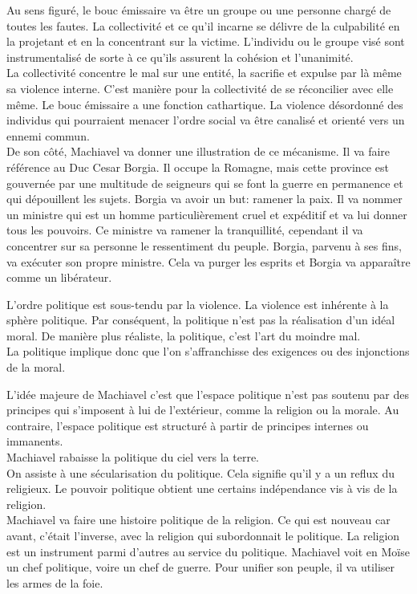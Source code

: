 \documentclass[10pt, a4paper, openany]{book}
\begin{document}
Au sens figuré, le bouc émissaire va être un groupe ou une personne chargé de toutes les fautes. La collectivité et ce qu'il incarne se délivre de la culpabilité en la projetant et en la concentrant sur la victime. L'individu ou le groupe visé sont instrumentalisé de sorte à ce qu'ils assurent la cohésion et l'unanimité. \\
La collectivité concentre le mal sur une entité, la sacrifie et expulse par là même sa violence interne. C'est manière pour la collectivité de se réconcilier avec elle même. Le bouc émissaire a une fonction cathartique. La violence désordonné des individus qui pourraient menacer l'ordre social va être canalisé et orienté vers un ennemi commun. \\
De son côté, Machiavel va donner une illustration de ce mécanisme. Il va faire référence au Duc Cesar Borgia. Il occupe la Romagne, mais cette province est gouvernée par une multitude de seigneurs qui se font la guerre en permanence et qui dépouillent les sujets. Borgia va avoir un but: ramener la paix. Il va nommer un ministre qui est un homme particulièrement cruel et expéditif et va lui donner tous les pouvoirs. Ce ministre va ramener la tranquillité, cependant il va concentrer sur sa personne le ressentiment du peuple. Borgia, parvenu à ses fins, va exécuter son propre ministre. Cela va purger les esprits et Borgia va apparaître comme un libérateur.


L'ordre politique est sous-tendu par la violence. La violence est inhérente à la sphère politique. Par conséquent, la politique n'est pas la réalisation d'un idéal moral. De manière plus réaliste, la politique, c'est l'art du moindre mal. \\
La politique implique donc que l'on s'affranchisse des exigences ou des injonctions de la moral. 


L'idée majeure de Machiavel c'est que l'espace politique n'est pas soutenu par des principes qui s'imposent à lui de l'extérieur, comme la religion ou la morale. Au contraire, l'espace politique est structuré à partir de principes internes ou immanents. \\
Machiavel rabaisse la politique du ciel vers la terre. \\
On assiste à une sécularisation du politique. Cela signifie qu'il y a un reflux du religieux. Le pouvoir politique obtient une certains indépendance vis à vis de la religion. \\
Machiavel va faire une histoire politique de la religion. Ce qui est nouveau car avant, c'était l'inverse, avec la religion qui subordonnait le politique. La religion est un instrument parmi d'autres au service du politique. Machiavel voit en Moïse un chef politique, voire un chef de guerre. Pour unifier son peuple, il va utiliser les armes de la foie. 
\end{document}
